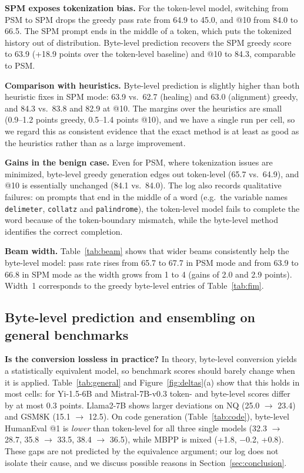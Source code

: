 \documentclass{article} %
\begin{document}
\textbf{SPM exposes tokenization bias.} For the token-level model, switching from PSM to SPM drops the greedy pass rate from 64.9 to 45.0, and @10 from 84.0 to 66.5. The SPM prompt ends in the middle of a token, which puts the tokenized history out of distribution. Byte-level prediction recovers the SPM greedy score to 63.9 (+18.9 points over the token-level baseline) and @10 to 84.3, comparable to PSM.

\textbf{Comparison with heuristics.} Byte-level prediction is slightly higher than both heuristic fixes in SPM mode: 63.9 vs.\ 62.7 (healing) and 63.0 (alignment) greedy, and 84.3 vs.\ 83.8 and 82.9 at @10. The margins over the heuristics are small (0.9--1.2 points greedy, 0.5--1.4 points @10), and we have a single run per cell, so we regard this as consistent evidence that the exact method is at least as good as the heuristics rather than as a large improvement.

\textbf{Gains in the benign case.} Even for PSM, where tokenization issues are minimized, byte-level greedy generation edges out token-level (65.7 vs.\ 64.9), and @10 is essentially unchanged (84.1 vs.\ 84.0). The log also records qualitative failures: on prompts that end in the middle of a word (e.g.\ the variable names \texttt{delimeter}, \texttt{collatz} and \texttt{palindrome}), the token-level model fails to complete the word because of the token-boundary mismatch, while the byte-level method identifies the correct completion.

\textbf{Beam width.} Table~\ref{tab:beam} shows that wider beams consistently help the byte-level model: pass rate rises from 65.7 to 67.7 in PSM mode and from 63.9 to 66.8 in SPM mode as the width grows from 1 to 4 (gains of 2.0 and 2.9 points). Width~1 corresponds to the greedy byte-level entries of Table~\ref{tab:fim}.



\subsection{Byte-level prediction and ensembling on general benchmarks}
\label{sec:exp_ens}
\textbf{Is the conversion lossless in practice?} In theory, byte-level conversion yields a statistically equivalent model, so benchmark scores should barely change when it is applied. Table~\ref{tab:general} and Figure~\ref{fig:deltas}(a) show that this holds in most cells: for Yi-1.5-6B and Mistral-7B-v0.3 token- and byte-level scores differ by at most 0.3 points. Llama2-7B shows larger deviations on NQ (25.0 $\rightarrow$ 23.4) and GSM8K (15.1 $\rightarrow$ 12.5). On code generation (Table~\ref{tab:code}), byte-level HumanEval @1 is \emph{lower} than token-level for all three single models (32.3 $\rightarrow$ 28.7, 35.8 $\rightarrow$ 33.5, 38.4 $\rightarrow$ 36.5), while MBPP is mixed (+1.8, $-$0.2, +0.8). These gaps are not predicted by the equivalence argument; our log does not isolate their cause, and we discuss possible reasons in Section~\ref{sec:conclusion}.
\end{document}
